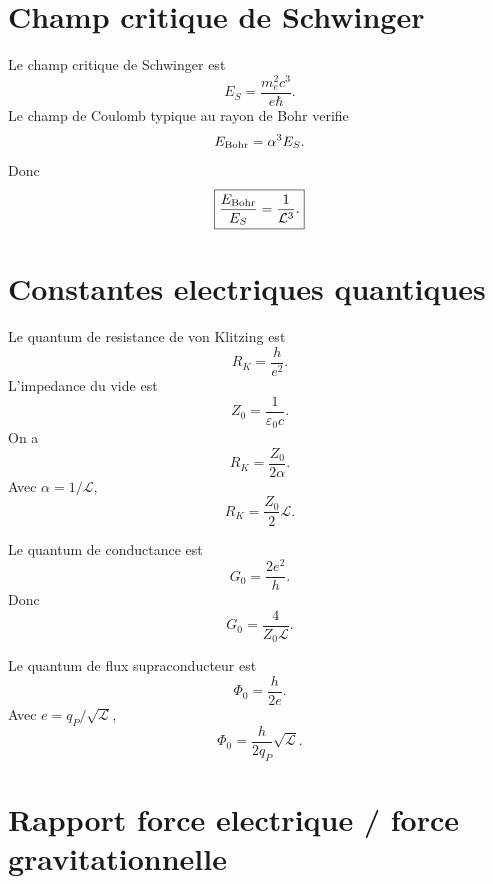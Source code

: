 \documentclass[11pt,a4paper]{article}
\newcommand{\cL}{\mathcal L}
\newcommand{\epsz}{\varepsilon_0}
\begin{document}
\section{Champ critique de Schwinger}

Le champ critique de Schwinger est
\begin{equation}
E_S=\frac{m_e^2c^3}{e\hbar}.
\end{equation}
Le champ de Coulomb typique au rayon de Bohr verifie
\begin{equation}
E_{\rm Bohr}=\alpha^3 E_S.
\end{equation}
Donc
\begin{equation}
\boxed{
\frac{E_{\rm Bohr}}{E_S}=\frac{1}{\cL^3}.
}
\end{equation}

\section{Constantes electriques quantiques}

Le quantum de resistance de von Klitzing est
\begin{equation}
R_K=\frac{h}{e^2}.
\end{equation}
L'impedance du vide est
\begin{equation}
Z_0=\frac{1}{\epsz c}.
\end{equation}
On a
\begin{equation}
R_K=\frac{Z_0}{2\alpha}.
\end{equation}
Avec \(\alpha=1/\cL\),
\begin{equation}
\boxed{
R_K=\frac{Z_0}{2}\cL.
}
\end{equation}

Le quantum de conductance est
\begin{equation}
G_0=\frac{2e^2}{h}.
\end{equation}
Donc
\begin{equation}
\boxed{
G_0=\frac{4}{Z_0\cL}.
}
\end{equation}

Le quantum de flux supraconducteur est
\begin{equation}
\Phi_0=\frac{h}{2e}.
\end{equation}
Avec \(e=q_P/\sqrt{\cL}\),
\begin{equation}
\boxed{
\Phi_0=\frac{h}{2q_P}\sqrt{\cL}.
}
\end{equation}

\section{Rapport force electrique / force gravitationnelle}
\end{document}
